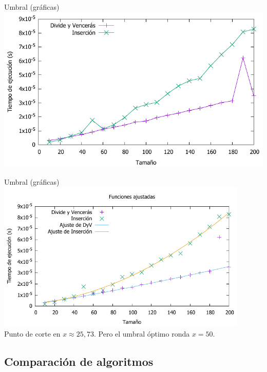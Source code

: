 \begin{frame}{Umbral (gráficas)}
	\includegraphics[width=\textwidth]{img/umbral_preferencias.pdf} \centering
\end{frame}

\begin{frame}{Umbral (gráficas)}
	\includegraphics[width=0.9\textwidth]{img/ajuste_preferencias.pdf} \centering
	\pause
	{\footnotesize \\
	Punto de corte en $x \approx 25,73$.
	\pause
	Pero el umbral óptimo ronda $x = 50$.
	}
\end{frame}

\subsection{Comparación de algoritmos}

